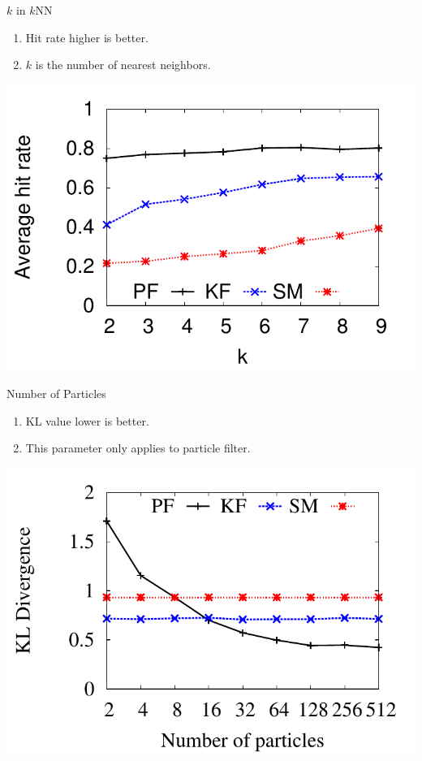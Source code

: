 \documentclass[xcolor={usenames,dvipsnames}]{beamer}
\begin{document}
\begin{frame}[label={sec:orge5fa32d}]{\(k\) in \(k\)NN}
\begin{enumerate}
\item Hit rate higher is better.
\item \(k\) is the number of nearest neighbors.
\end{enumerate}

\begin{center}
\includegraphics[width=.7\textwidth]{img/hit-k.pdf}
\end{center}
\end{frame}

\begin{frame}[label={sec:orge5ccc0f}]{Number of Particles}
\begin{enumerate}
\item KL value lower is better.
\item This parameter only applies to particle filter.
\end{enumerate}

\begin{center}
\includegraphics[width=.7\textwidth]{img/kl-p.pdf}
\end{center}
\end{frame}
\end{document}
